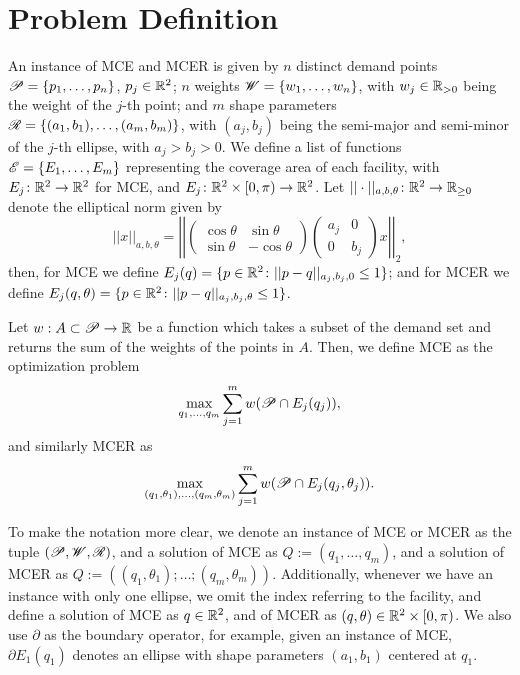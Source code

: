 	\section{Problem Definition}
	
	An instance of MCE and MCER is given by $n$ distinct demand points $\mathscr{P}=\{p_1, \dots, p_n\}$, $p_j\in\mathbb{R}^2$; $n$ weights $\mathscr{W}=\{w_1, \dots, w_n\}$, with $w_j\in\mathbb{R}_{>0}$ being the weight of the $j$-th point; and $m$ shape parameters $\mathscr{R}=\{(a_1, b_1), \dots, (a_m, b_m)\}$, with $(a_j, b_j)$ being the semi-major and semi-minor of the $j$-th ellipse, with $a_j > b_j > 0$. We define a list of functions $\mathscr{E}=\{E_1, \dots, E_m\}$ representing the coverage area of each facility, with $E_j \colon \mathbb{R}^2 \to \mathbb{R}^2$ for MCE, and $E_j \colon \mathbb{R}^2\times [0, \pi)\to \mathbb{R}^2$. Let $||\cdot||_{a,b, \theta} \colon \mathbb{R}^2 \to \mathbb{R}_{\ge0}$ denote the elliptical norm given by
	\begin{equation*}
	||x||_{a,b, \theta}=\left|\left|
	\left(\begin{array}{rr}
	\cos{\theta} & \sin{\theta}\\
	\sin{\theta} & -\cos{\theta}
	\end{array}
	\right)
	\left(\begin{array}{cc}
	a_j & 0\\
	0 & b_j
	\end{array}\right) x \right|\right|_2,
	\end{equation*}
	then, for MCE we define $E_j(q)=\{p \in \mathbb{R}^2 \colon ||p-q||_{a_j,b_j,0} \le 1\}$; and for MCER we define $E_j(q, \theta)=\{p \in \mathbb{R}^2 \colon ||p-q||_{a_j,b_j, \theta} \le 1\}$.
	
Let $w : A \subset \mathscr{P} \to \mathbb{R}$ be a function which takes a subset of the demand set and returns the sum of the weights of the points in $A$. Then, we define MCE as the optimization problem 
\begin{equation*}
\max_{q_1, \dots, q_m} \sum_{j=1}^m w(\mathscr{P} \cap E_j(q_j)),
\end{equation*}
and similarly MCER as
\begin{equation*}
\max_{(q_1, \theta_1), \dots, (q_m, \theta_m)} \sum_{j=1}^m w(\mathscr{P} \cap E_j(q_j, \theta_j)).
\end{equation*}

To make the notation more clear, we denote an instance of MCE or MCER as the tuple $(\mathscr{P}, \mathscr{W}, \mathscr{R})$, and a solution of MCE as $Q:=(q_1, \dots, q_m)$, and a solution of MCER as $Q:=((q_1, \theta_1); \dots; (q_m, \theta_m))$. Additionally, whenever we have an instance with only one ellipse, we omit the index referring to the facility, and define a solution of MCE as $q\in\mathbb{R}^2$, and of MCER as $(q, \theta) \in \mathbb{R}^2\times [0, \pi)$.
We also use $\partial$ as the boundary operator, for example, given an instance of MCE, $\partial E_1(q_1)$ denotes an ellipse with shape parameters $(a_1, b_1)$ centered at $q_1$.

